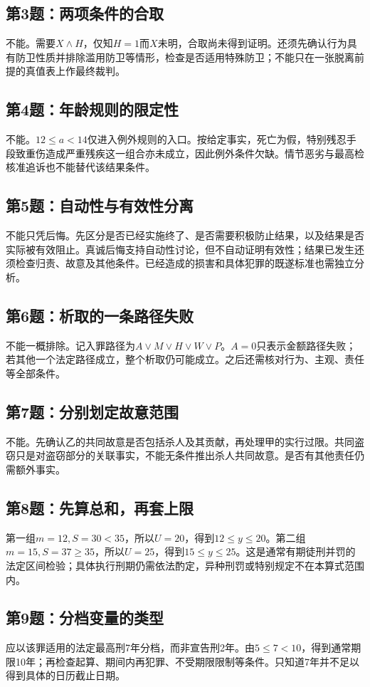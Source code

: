 \subsection{第3题：两项条件的合取}
不能。需要$X\wedge H$，仅知$H=1$而$X$未明，合取尚未得到证明。还须先确认行为具有防卫性质并排除滥用防卫等情形，检查是否适用特殊防卫；不能只在一张脱离前提的真值表上作最终裁判。

\subsection{第4题：年龄规则的限定性}
不能。$12\le a<14$仅进入例外规则的入口。按给定事实，死亡为假，特别残忍手段致重伤造成严重残疾这一组合亦未成立，因此例外条件欠缺。情节恶劣与最高检核准追诉也不能替代该结果条件。

\subsection{第5题：自动性与有效性分离}
不能只凭后悔。先区分是否已经实施终了、是否需要积极防止结果，以及结果是否实际被有效阻止。真诚后悔支持自动性讨论，但不自动证明有效性；结果已发生还须检查归责、故意及其他条件。已经造成的损害和具体犯罪的既遂标准也需独立分析。

\subsection{第6题：析取的一条路径失败}
不能一概排除。记入罪路径为$A\vee M\vee H\vee W\vee P$。$A=0$只表示金额路径失败；若其他一个法定路径成立，整个析取仍可能成立。之后还需核对行为、主观、责任等全部条件。

\subsection{第7题：分别划定故意范围}
不能。先确认乙的共同故意是否包括杀人及其贡献，再处理甲的实行过限。共同盗窃只是对盗窃部分的关联事实，不能无条件推出杀人共同故意。是否有其他责任仍需额外事实。

\subsection{第8题：先算总和，再套上限}
第一组$m=12,S=30<35$，所以$U=20$，得到$12\le y\le20$。第二组$m=15,S=37\ge35$，所以$U=25$，得到$15\le y\le25$。这是通常有期徒刑并罚的法定区间检验；具体执行刑期仍需依法酌定，异种刑罚或特别规定不在本算式范围内。

\subsection{第9题：分档变量的类型}
应以该罪适用的法定最高刑7年分档，而非宣告刑2年。由$5\le7<10$，得到通常期限10年；再检查起算、期间内再犯罪、不受期限限制等条件。只知道7年并不足以得到具体的日历截止日期。

